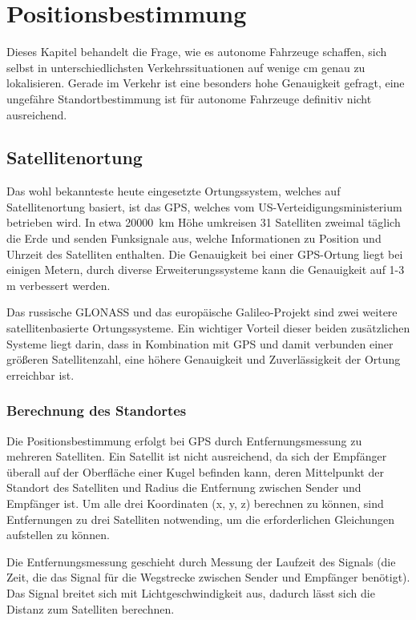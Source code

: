 \chapter{Positionsbestimmung}\label{kapitel-2}

Dieses Kapitel behandelt die Frage, wie es autonome Fahrzeuge schaffen, sich selbst in unterschiedlichsten Verkehrssituationen auf wenige \si{\centi\meter} genau zu lokalisieren. Gerade im Verkehr ist eine besonders hohe Genauigkeit gefragt, eine ungefähre Standortbestimmung ist für autonome Fahrzeuge definitiv nicht ausreichend.


\section{Satellitenortung}

Das wohl bekannteste heute eingesetzte Ortungssystem, welches auf Satellitenortung basiert, ist das \ac{GPS}, welches vom US-Verteidigungsministerium betrieben wird.  In etwa \SI{20000}{\kilo\meter} Höhe umkreisen 31 Satelliten zweimal täglich die Erde und senden Funksignale aus, welche Informationen zu Position und Uhrzeit des Satelliten enthalten. Die Genauigkeit bei einer \ac{GPS}-Ortung liegt bei einigen Metern, durch diverse Erweiterungssysteme kann die Genauigkeit auf 1-3 \si{\meter} verbessert werden.

Das russische GLONASS und das europäische Galileo-Projekt sind zwei weitere satellitenbasierte Ortungssysteme. Ein wichtiger Vorteil dieser beiden zusätzlichen Systeme liegt darin, dass in Kombination mit \ac{GPS} und damit verbunden einer größeren Satellitenzahl, eine höhere Genauigkeit und Zuverlässigkeit der Ortung erreichbar ist.

\subsection{Berechnung des Standortes}

Die Positionsbestimmung erfolgt bei \ac{GPS} durch Entfernungsmessung zu mehreren Satelliten. Ein Satellit ist nicht ausreichend, da sich der Empfänger überall auf der Oberfläche einer Kugel befinden kann, deren Mittelpunkt der Standort des Satelliten und Radius die Entfernung zwischen Sender und Empfänger ist. Um alle drei Koordinaten (x, y, z) berechnen zu können, sind Entfernungen zu drei Satelliten notwending, um die erforderlichen Gleichungen aufstellen zu können.

Die Entfernungsmessung geschieht durch Messung der Laufzeit des Signals (\dH die Zeit, die das Signal für die Wegstrecke zwischen Sender und Empfänger benötigt). Das Signal breitet sich mit Lichtgeschwindigkeit aus, dadurch lässt sich die Distanz zum Satelliten berechnen.

